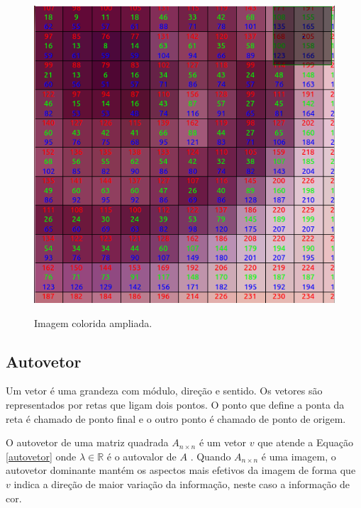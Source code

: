 \begin{figure}[hb]
\begin{center}
  \centering
  \caption{Imagem colorida ampliada.}
      \includegraphics[scale=0.5]{images/lenaZoom.png}
    
    \label{coloridaAmpliada}
  
\end{center}

\end{figure}

\subsection{Autovetor}
Um vetor é uma grandeza com módulo, direção e sentido. Os vetores são representados por retas que ligam dois pontos. O ponto que define a ponta da reta é chamado de ponto final e o outro ponto é chamado de ponto de origem. 

O autovetor de uma matriz quadrada $A_{n \times n}$ é um vetor $v$ que atende a Equação \ref{autovetor} onde $\lambda \in \mathbb{R}$ é o autovalor de $A$ \cite{boldrini}. Quando $A_{n \times n}$ é uma imagem, o autovetor dominante mantém os aspectos mais efetivos da imagem de forma que $v$ indica a direção de maior variação da informação, neste caso a informação de cor.

